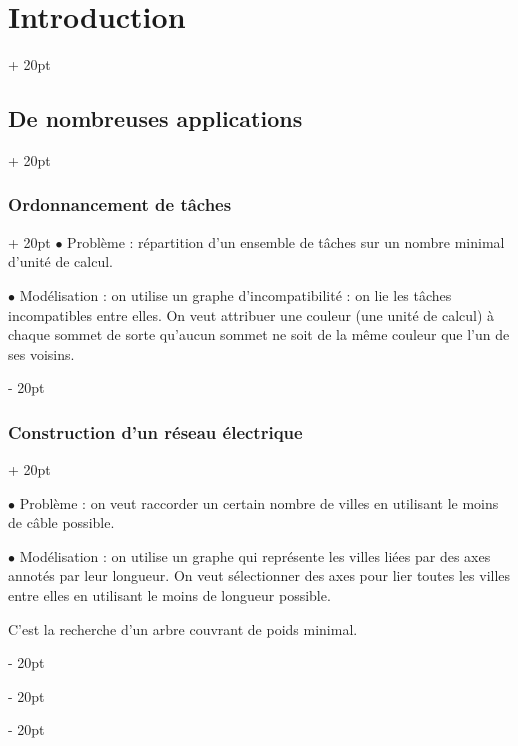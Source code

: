 \documentclass[a4paper, 12pt, twoside]{article}
\newcommand{\ind}[1][20pt]{\advance\leftskip + #1}
\newcommand{\deind}[1][20pt]{\advance\leftskip - #1}
\newenvironment{indt}[2][20pt]{#2 \par \ind[#1]}{\par \deind} %
\begin{document}
\begin{indt}{\section{Introduction}}
\begin{indt}{\subsection{De nombreuses applications}}
            \vspace{12pt}
            
            \begin{indt}{\subsubsection{Ordonnancement de tâches}}
                $\bullet$ Problème : répartition d'un ensemble de tâches sur un nombre minimal d'unité de calcul.

                $\bullet$ Modélisation : on utilise un graphe d'incompatibilité : on lie les tâches incompatibles entre elles. On veut attribuer une couleur (une unité de calcul) à chaque sommet de sorte qu'aucun sommet ne soit de la même couleur que l'un de ses voisins.
            \end{indt}

            \vspace{12pt}
            
            \begin{indt}{\subsubsection{Construction d'un réseau électrique}}
                \label{1.2.4}
                
                $\bullet$ Problème : on veut raccorder un certain nombre de villes en utilisant le moins de câble possible.

                $\bullet$ Modélisation : on utilise un graphe qui représente les villes liées par des axes annotés par leur longueur. On veut sélectionner des axes pour lier toutes les villes entre elles en utilisant le moins de longueur possible.

                C'est la recherche d'un arbre couvrant de poids minimal.
            \end{indt}
        \end{indt}
        
    \end{indt}

    \vspace{12pt}
    
\end{document}
